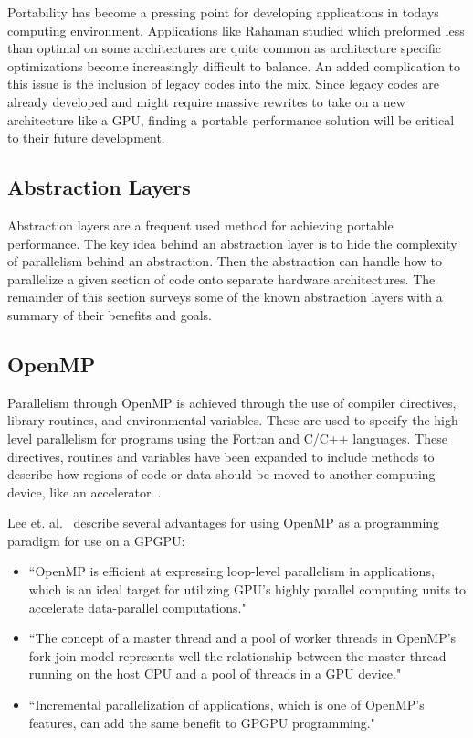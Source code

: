 Portability has become a pressing point for developing applications in todays computing environment.
%
Applications like Rahaman studied which preformed less than optimal on some architectures are quite common as architecture specific optimizations become increasingly difficult to balance.
%
An added complication to this issue is the inclusion of legacy codes into the mix.
%
Since legacy codes are already developed and might require massive rewrites to take on a new architecture like a GPU, finding a portable performance solution will be critical to their future development.

\subsection{ \textbf{Abstraction Layers}}
\label{sec:abstractionLayers}

Abstraction layers are a frequent used method for achieving portable performance.
%
The key idea behind an abstraction layer is to hide the complexity of parallelism behind an abstraction.
%
Then the abstraction can handle how to parallelize a given section of code onto separate hardware architectures.
%
The remainder of this section surveys some of the known abstraction layers with a summary of their benefits and goals.

\subsection*{\textbf{OpenMP}}

Parallelism through OpenMP is achieved through the use of compiler directives, library routines, and environmental variables.
%
These are used to specify the high level parallelism for programs using the Fortran and C/C++ languages.
%
These directives, routines and variables have been expanded to include methods to describe how regions of code or data should be moved to another computing device, like an accelerator~\cite{openmp}.

Lee et. al.~\cite{lee2009openmp} describe several advantages for using OpenMP as a programming paradigm for use on a GPGPU:
\begin{itemize}
\item ``OpenMP is efficient at expressing loop-level parallelism in applications, which is an ideal target for utilizing GPU's highly parallel computing units to accelerate data-parallel computations."
\item ``The concept of a master thread and a pool of worker threads in OpenMP's fork-join model represents well the relationship between the master thread running on the host CPU and a pool of threads in a GPU device."
\item ``Incremental parallelization of applications, which is one of OpenMP's features, can add the same benefit to GPGPU programming."
\end{itemize}

